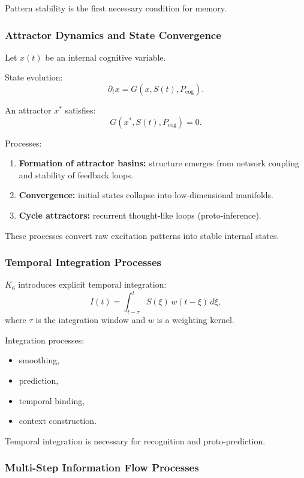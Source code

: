 Pattern stability is the first necessary condition for memory.

\subsubsection{Attractor Dynamics and State Convergence}

Let $x(t)$ be an internal cognitive variable.

State evolution:
\[
\partial_t x = G(x, S(t), P_{\text{cog}}).
\]

An attractor $x^\ast$ satisfies:
\[
G(x^\ast, S(t), P_{\text{cog}})=0.
\]

Processes:
\begin{enumerate}
    \item \textbf{Formation of attractor basins:}
    structure emerges from network coupling and stability of feedback loops.
    \item \textbf{Convergence:}
    initial states collapse into low-dimensional manifolds.
    \item \textbf{Cycle attractors:}
    recurrent thought-like loops (proto-inference).
\end{enumerate}

These processes convert raw excitation patterns into stable internal states.

\subsubsection{Temporal Integration Processes}

$K_6$ introduces explicit temporal integration:
\[
I(t) = \int_{t-\tau}^{t} S(\xi)\, w(t-\xi)\,d\xi,
\]
where $\tau$ is the integration window and $w$ is a weighting kernel.

Integration processes:
\begin{itemize}
    \item smoothing,
    \item prediction,
    \item temporal binding,
    \item context construction.
\end{itemize}

Temporal integration is necessary for recognition and proto-prediction.

\subsubsection{Multi-Step Information Flow Processes}

